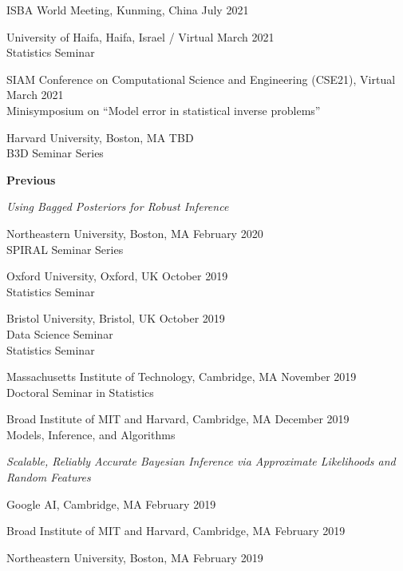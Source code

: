 \documentclass[margin,line]{res}
\newenvironment{talkgroup}{\setlength{\parskip}{3pt}\everypar{\hangafter=1\hangindent=1em\relax}\par}{\par\everypar{\hangafter=0\relax}}
\begin{document}
\begin{resume}
\begin{talkgroup}

ISBA World Meeting, Kunming, China \hfill July 2021

University of Haifa, Haifa, Israel / Virtual \hfill March 2021 \\
Statistics Seminar

SIAM Conference on Computational Science and Engineering (CSE21), Virtual \hfill March 2021 \\
Minisymposium on ``Model error in statistical inverse problems''

Harvard University, Boston, MA \hfill TBD \\
B3D Seminar Series

\end{talkgroup}

\textbf{Previous}

\emph{Using Bagged Posteriors for Robust Inference}

\begin{talkgroup}
Northeastern University, Boston, MA \hfill February 2020 \\
SPIRAL Seminar Series

Oxford University, Oxford, UK \hfill October 2019 \\
Statistics Seminar

Bristol University, Bristol, UK \hfill October 2019 \\
Data Science Seminar \\
Statistics Seminar

Massachusetts Institute of Technology, Cambridge, MA  \hfill November 2019 \\
Doctoral Seminar in Statistics

Broad Institute of MIT and Harvard, Cambridge, MA \hfill December 2019 \\
Models, Inference, and Algorithms

\end{talkgroup}

\emph{Scalable, Reliably Accurate Bayesian Inference via Approximate Likelihoods and Random Features}

\begin{talkgroup}
Google AI, Cambridge, MA \hfill February 2019

Broad Institute of MIT and Harvard, Cambridge, MA \hfill February 2019

Northeastern University, Boston, MA \hfill February 2019


\end{talkgroup}
\end{resume}
\end{document}

